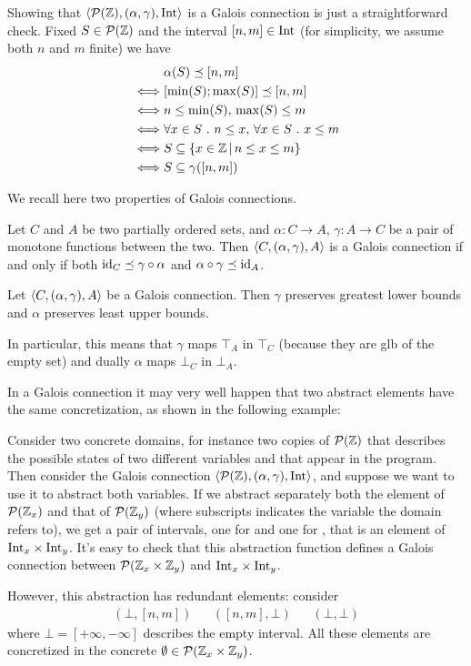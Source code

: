 \begin{example}[Intervals]
	Showing that $\langle \mathcal{P}(\mathbb{Z}), (\alpha, \gamma), \text{Int} \rangle$ is a Galois connection is just a straightforward check. Fixed $S \in \mathcal{P}(\mathbb{Z})$ and the interval $[n, m] \in \text{Int}$ (for simplicity, we assume both $n$ and $m$ finite) we have
	\begin{align*}
		& \alpha(S) \preceq [n, m] \\
		\iff &[\min(S); \max(S)] \preceq [n, m] \\
		\iff &n \le \min(S),\, \max(S) \le m \\
		\iff &\forall x \in S\ .\ n \le x,\, \forall x \in S\ .\ x \le m \\
		\iff &S \subseteq \{ x \in \mathbb{Z} \,\vert\, n \le x \le m \} \\
		\iff &S \subseteq \gamma([n, m])
	\end{align*}
\end{example}
We recall here two properties of Galois connections.
\begin{prop}\label{ch2:th:gc-extensive-charact}
	Let $C$ and $A$ be two partially ordered sets, and $\alpha : C \rightarrow A$, $\gamma : A \rightarrow C$ be a pair of monotone functions between the two.
	Then $\langle C, (\alpha, \gamma), A \rangle$ is a Galois connection if and only if both $\text{id}_C \preceq \gamma \circ \alpha$ and $\alpha \circ \gamma \preceq \text{id}_A$.
\end{prop}
\begin{prop}\label{ch2:th:gc-adjoints-preserve-glb-lub}
	Let $\langle C, (\alpha, \gamma), A \rangle$ be a Galois connection. Then $\gamma$ preserves greatest lower bounds and $\alpha$ preserves least upper bounds.
\end{prop}
In particular, this means that $\gamma$ maps $\top_A$ in $\top_C$ (because they are glb of the empty set) and dually $\alpha$ maps $\bot_C$ in $\bot_A$.

In a Galois connection it may very well happen that two abstract elements have the same concretization, as shown in the following example:
\begin{example}
	Consider two concrete domains, for instance two copies of $\mathcal{P}(\mathbb{Z})$ that describes the possible states of two different variables  and  that appear in the program.
	Then consider the Galois connection $\langle \mathcal{P}(\mathbb{Z}), (\alpha, \gamma), \text{Int} \rangle$, and suppose we want to use it to abstract both variables. If we abstract separately both the element of $\mathcal{P}(\mathbb{Z}_x)$ and that of $\mathcal{P}(\mathbb{Z}_y)$ (where subscripts indicates the variable the domain refers to), we get a pair of intervals, one for  and one for , that is an element of $\text{Int}_x \times \text{Int}_y$. It's easy to check that this abstraction function defines a Galois connection between $\mathcal{P}(\mathbb{Z}_x \times \mathbb{Z}_y)$ and $\text{Int}_x \times \text{Int}_y$.

	However, this abstraction has redundant elements: consider
	\begin{align*}
		(\bot, [n, m]) && ([n, m], \bot) && (\bot, \bot)
	\end{align*}
	where $\bot = [+\infty, -\infty]$ describes the empty interval. All these elements are concretized in the concrete $\emptyset \in \mathcal{P}(\mathbb{Z}_x \times \mathbb{Z}_y)$.
\end{example}

